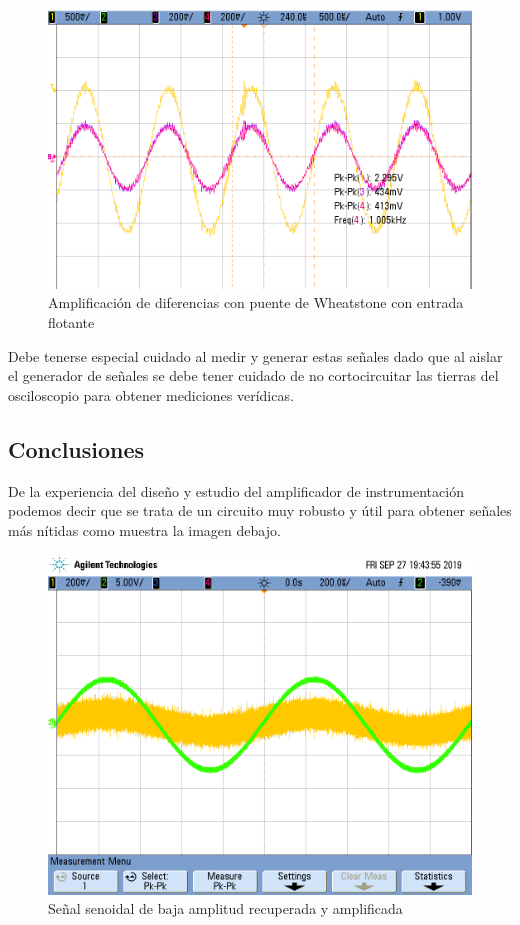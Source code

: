\begin{figure}[H]
	\centering
	\includegraphics[height=0.3\textheight]{./ImagenesDeOsciloscopio/WheatstoneAislado.png}
	\caption{Amplificación de diferencias con puente de Wheatstone con entrada flotante}
\end{figure}


Debe tenerse especial cuidado al medir y generar estas señales dado que al aislar el generador de señales se debe tener cuidado de no cortocircuitar las tierras del osciloscopio para obtener mediciones verídicas.

\subsection{Conclusiones}

De la experiencia del diseño y estudio del amplificador de instrumentación podemos decir que se trata de un circuito muy robusto y útil para obtener señales más nítidas como muestra la imagen debajo.

\begin{figure}[H]
	\centering
	\includegraphics[height=0.3\textheight]{./ImagenesDeOsciloscopio/sinfiltrosSeno.png}
	\caption{Señal senoidal de baja amplitud recuperada  y amplificada}
\end{figure}


